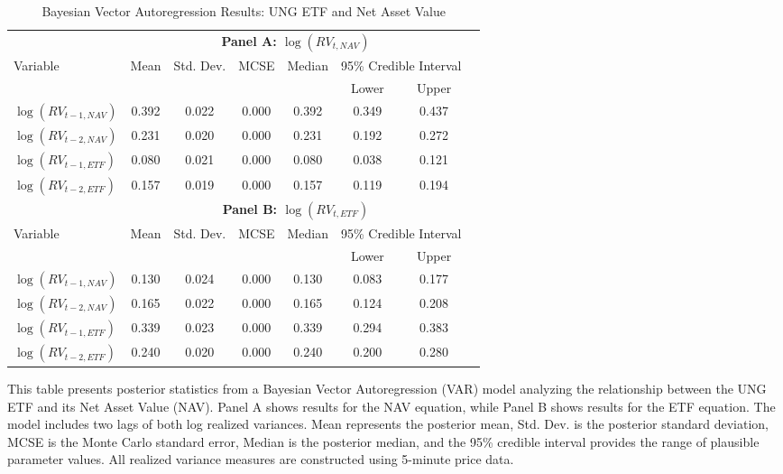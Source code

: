\begin{landscape}
\begin{table}[htbp]
\centering
\caption{Bayesian Vector Autoregression Results: UNG ETF and Net Asset Value}
\label{tab:VAR_UNG}
\begin{threeparttable}
\footnotesize
\begin{tabular}{@{}lccccccc@{}}
\toprule
 & \multicolumn{6}{c}{\textbf{Panel A: $\log(RV_{t,NAV})$}} \\
\cmidrule(lr){2-7}
Variable & Mean & Std. Dev. & MCSE & Median & \multicolumn{2}{c}{95\% Credible Interval} \\
\cmidrule(lr){6-7}
 &  &  &  &  & Lower & Upper \\
\midrule
$\log(RV_{t-1,NAV})$ & 0.392 & 0.022 & 0.000 & 0.392 & 0.349 & 0.437 \\
$\log(RV_{t-2,NAV})$ & 0.231 & 0.020 & 0.000 & 0.231 & 0.192 & 0.272 \\
$\log(RV_{t-1,ETF})$ & 0.080 & 0.021 & 0.000 & 0.080 & 0.038 & 0.121 \\
$\log(RV_{t-2,ETF})$ & 0.157 & 0.019 & 0.000 & 0.157 & 0.119 & 0.194 \\
\addlinespace[0.3cm]

 & \multicolumn{6}{c}{\textbf{Panel B: $\log(RV_{t,ETF})$}} \\
\cmidrule(lr){2-7}
Variable & Mean & Std. Dev. & MCSE & Median & \multicolumn{2}{c}{95\% Credible Interval} \\
\cmidrule(lr){6-7}
 &  &  &  &  & Lower & Upper \\
\midrule
$\log(RV_{t-1,NAV})$ & 0.130 & 0.024 & 0.000 & 0.130 & 0.083 & 0.177 \\
$\log(RV_{t-2,NAV})$ & 0.165 & 0.022 & 0.000 & 0.165 & 0.124 & 0.208 \\
$\log(RV_{t-1,ETF})$ & 0.339 & 0.023 & 0.000 & 0.339 & 0.294 & 0.383 \\
$\log(RV_{t-2,ETF})$ & 0.240 & 0.020 & 0.000 & 0.240 & 0.200 & 0.280 \\
\bottomrule
\end{tabular}
\begin{tablenotes}
\small
\item This table presents posterior statistics from a Bayesian Vector Autoregression (VAR) model analyzing the relationship between the UNG ETF and its Net Asset Value (NAV). Panel A shows results for the NAV equation, while Panel B shows results for the ETF equation. The model includes two lags of both log realized variances. Mean represents the posterior mean, Std. Dev. is the posterior standard deviation, MCSE is the Monte Carlo standard error, Median is the posterior median, and the 95\% credible interval provides the range of plausible parameter values. All realized variance measures are constructed using 5-minute price data.
\end{tablenotes}
\end{threeparttable}
\end{table}
\end{landscape}